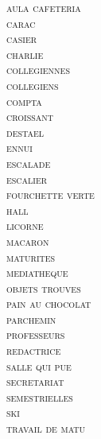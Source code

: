 \begin{minipage}{.61\textwidth}
{\begin{tabular}{|c*{20}{|c}}
	\end{tabular}
	}
\end{minipage}\begin{minipage}{.41\textwidth}
	\begin{multicols*}{2}
		\textsc{aula
		cafeteria\\
		carac\\
		casier\\
		charlie\\
		collegiennes\\
		collegiens\\
		compta\\
		croissant\\
		destael\\
		ennui\\
		escalade\\
		escalier\\
		fourchette verte\\
		hall\\
		licorne\\
		macaron\\
		maturites\\
		mediatheque\\
		objets trouves\\
		pain au chocolat\\
		parchemin\columnbreak\\
		professeurs\\
		redactrice\\
		salle qui pue\\
		secretariat\\
		semestrielles\\
		ski\\
		travail de matu}
	\end{multicols*}
\end{minipage}


